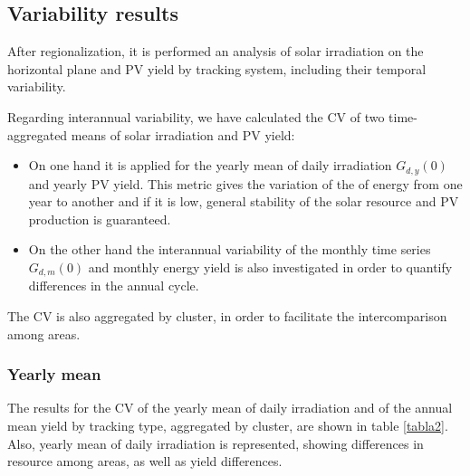 \subsection{Variability results}

After regionalization, it is performed an analysis of solar irradiation on the horizontal plane and PV yield by tracking system, including their temporal variability.

Regarding interannual variability, we have calculated the CV of two time-aggregated means of solar irradiation and PV yield:

\begin{itemize}
\item On one hand it is applied for the yearly mean of daily irradiation $G_{d,y}(0)$ and yearly PV yield. This metric gives the variation of the of energy from one year to another and if it is low, general stability of the solar resource and PV production is guaranteed. 
\item On the other hand the interannual variability of the monthly time series $G_{d,m}(0)$ and monthly energy yield is also investigated in order to quantify differences in the annual cycle. 
\end{itemize}

The CV is also aggregated by cluster, in order to facilitate the intercomparison among areas.



\subsubsection{Yearly mean}

The results for the CV of the yearly mean of daily irradiation and of the annual mean yield by tracking type, aggregated by cluster, are shown in table \ref{tabla2}. Also, yearly mean of daily irradiation is represented, showing differences in resource among areas, as well as yield differences.

